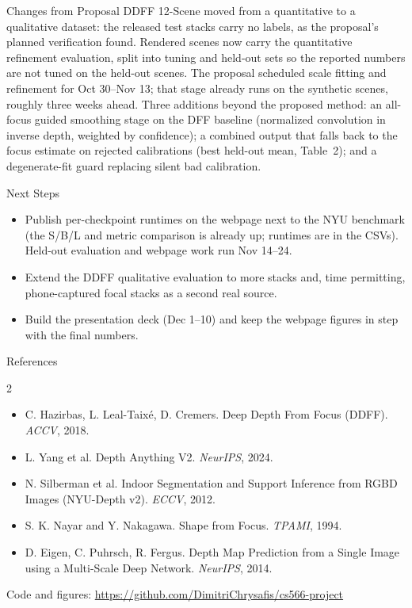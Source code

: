 \documentclass[11pt]{article}
\begin{document}
\begin{reportbox}{Changes from Proposal}
DDFF 12-Scene moved from a quantitative to a qualitative dataset: the
released test stacks carry no labels, as the proposal's planned
verification found. Rendered scenes now carry the quantitative
refinement evaluation, split into tuning and held-out sets so the
reported numbers are not tuned on the held-out scenes. The proposal
scheduled scale fitting and refinement for Oct 30--Nov 13; that stage
already runs on the synthetic scenes, roughly three weeks ahead.
Three additions beyond the proposed method: an all-focus guided
smoothing stage on the DFF baseline (normalized convolution in
inverse depth, weighted by confidence); a combined output that falls
back to the focus estimate on rejected calibrations (best held-out
mean, Table~2); and a degenerate-fit guard replacing silent bad
calibration.
\end{reportbox}

\begin{reportbox}{Next Steps}
\begin{itemize}
\item Publish per-checkpoint runtimes on the webpage next to the NYU
  benchmark (the S/B/L and metric comparison is already up; runtimes
  are in the CSVs). Held-out evaluation and webpage work run
  Nov 14--24.
\item Extend the DDFF qualitative evaluation to more stacks and, time
  permitting, phone-captured focal stacks as a second real source.
\item Build the presentation deck (Dec 1--10) and keep the webpage
  figures in step with the final numbers.
\end{itemize}
\end{reportbox}

\begin{reportbox}{References}
\begin{multicols}{2}
\fontsize{8}{9.5}\selectfont
\begin{itemize}[label={},leftmargin=0.8em,itemsep=1.5pt,topsep=0pt]
\item C. Hazirbas, L. Leal-Taix\'e, D. Cremers. Deep Depth From
  Focus (DDFF). \emph{ACCV}, 2018.
\item L. Yang et al. Depth Anything V2. \emph{NeurIPS}, 2024.
\item N. Silberman et al. Indoor Segmentation and Support Inference
  from RGBD Images (NYU-Depth v2). \emph{ECCV}, 2012.
\item S. K. Nayar and Y. Nakagawa. Shape from Focus. \emph{TPAMI},
  1994.
\item D. Eigen, C. Puhrsch, R. Fergus. Depth Map Prediction from a
  Single Image using a Multi-Scale Deep Network. \emph{NeurIPS}, 2014.
\end{itemize}
\end{multicols}
\end{reportbox}

\begin{center}
\footnotesize Code and figures: \url{https://github.com/DimitriChrysafis/cs566-project}
\end{center}
\end{document}
